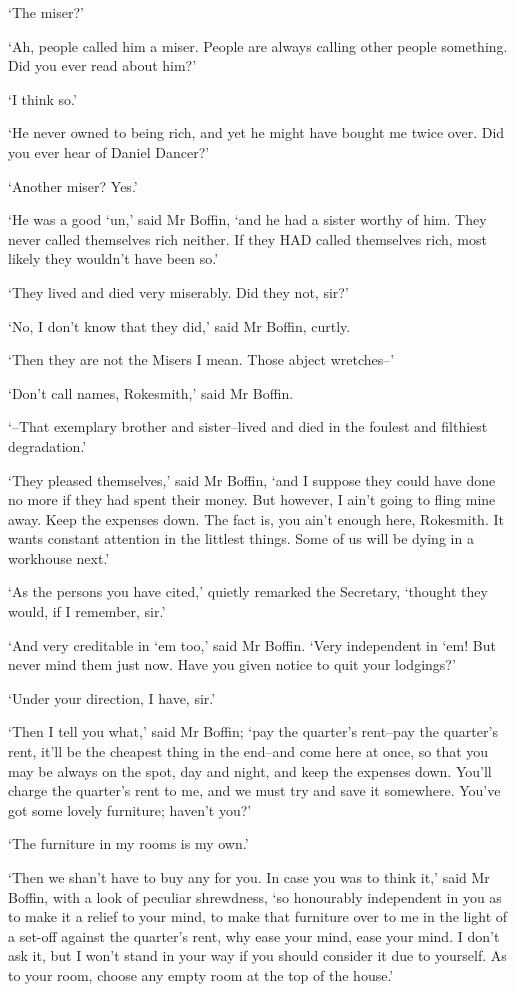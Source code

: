 ‘The miser?’

‘Ah, people called him a miser. People are always calling other people
something. Did you ever read about him?’

‘I think so.’

‘He never owned to being rich, and yet he might have bought me twice
over. Did you ever hear of Daniel Dancer?’

‘Another miser? Yes.’

‘He was a good ‘un,’ said Mr Boffin, ‘and he had a sister worthy of him.
They never called themselves rich neither. If they HAD called themselves
rich, most likely they wouldn’t have been so.’

‘They lived and died very miserably. Did they not, sir?’

‘No, I don’t know that they did,’ said Mr Boffin, curtly.

‘Then they are not the Misers I mean. Those abject wretches--’

‘Don’t call names, Rokesmith,’ said Mr Boffin.

‘--That exemplary brother and sister--lived and died in the foulest and
filthiest degradation.’

‘They pleased themselves,’ said Mr Boffin, ‘and I suppose they could
have done no more if they had spent their money. But however, I ain’t
going to fling mine away. Keep the expenses down. The fact is, you ain’t
enough here, Rokesmith. It wants constant attention in the littlest
things. Some of us will be dying in a workhouse next.’

‘As the persons you have cited,’ quietly remarked the Secretary,
‘thought they would, if I remember, sir.’

‘And very creditable in ‘em too,’ said Mr Boffin. ‘Very independent in
‘em! But never mind them just now. Have you given notice to quit your
lodgings?’

‘Under your direction, I have, sir.’

‘Then I tell you what,’ said Mr Boffin; ‘pay the quarter’s rent--pay the
quarter’s rent, it’ll be the cheapest thing in the end--and come here at
once, so that you may be always on the spot, day and night, and keep the
expenses down. You’ll charge the quarter’s rent to me, and we must try
and save it somewhere. You’ve got some lovely furniture; haven’t you?’

‘The furniture in my rooms is my own.’

‘Then we shan’t have to buy any for you. In case you was to think it,’
said Mr Boffin, with a look of peculiar shrewdness, ‘so honourably
independent in you as to make it a relief to your mind, to make that
furniture over to me in the light of a set-off against the quarter’s
rent, why ease your mind, ease your mind. I don’t ask it, but I won’t
stand in your way if you should consider it due to yourself. As to your
room, choose any empty room at the top of the house.’


